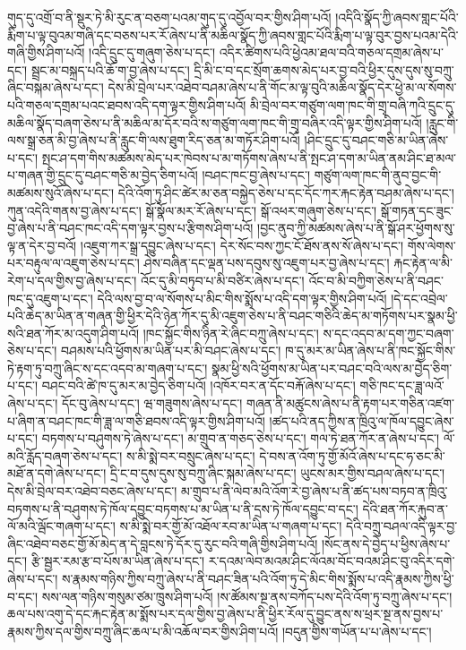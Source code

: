 གུད་དུ་འགྲོ་བ་ནི་སྡུར་ཏེ་མི་རུང་ན་བཅག་པའམ་གུད་དུ་འབྱོལ་བར་གྱིས་ཤིག་པའོ། །འདིའི་སྣོད་ཀྱི་ཞབས་གླང་པོའི་རྨིག་པ་ལྟ་བུའམ་གཞི་དང་བཅས་པར་རོ་ཞེས་པ་ནི་མཆིལ་སྣོད་ཀྱི་ཞབས་གླང་པོའི་རྨིག་པ་ལྟ་བུར་བྱས་པའམ་དེའི་གཞི་གྱིས་ཤིག་པའོ། །འདི་དྲུང་དུ་གཞུག་ཅེས་པ་དང་། འདིར་ཚིགས་པའི་ཕྱེའམ་ཐལ་བའི་གཅལ་དགྲམ་ཞེས་པ་དང་། སྦྲང་མ་བསྐྲད་པའི་ཆོ་ག་བྱ་ཞེས་པ་དང་། དྲི་མི་ང་བ་དང་སྲོག་ཆགས་མེད་པར་བྱ་བའི་ཕྱིར་དུས་དུས་སུ་བཀྲུ་ཞིང་བསྐམ་ཞེས་པ་དང་། དེས་མི་བྲེལ་པར་འཐེབ་བཤམ་ཞེས་པ་ནི་གོང་མ་ལྟ་བུའི་མཆིལ་སྣོད་དེར་ཕྱེ་མ་ལ་སོགས་པའི་གཅལ་དགྲམ་པའང་ཐབས་འདི་དག་ལྟར་གྱིས་ཤིག་པའོ། མི་བྲེལ་བར་གཙུག་ལག་ཁང་གི་གྲྭ་བཞི་ཀའི་དྲུང་དུ་མཆིལ་སྣོད་བཞག་ཅེས་པ་ནི་མཆིལ་མ་དོར་བའི་ས་གཙུག་ལག་ཁང་གི་གྲྭ་བཞིར་འདི་ལྟར་གྱིས་ཤིག་པའོ། །རླུང་གི་ལས་སྒྲ་ཅན་མི་བྱ་ཞེས་པ་ནི་རླུང་གི་ལས་ཐུག་རིད་ཅན་མ་གཏོར་ཤིག་པའོ། །ཤིང་དྲུང་དུ་བཤང་གཅི་མ་ཡིན་ཞེས་པ་དང་། སྤང་ཤ་དག་གིས་མཚམས་མེད་པར་ཁེབས་པ་མ་གཏོགས་ཞེས་པ་ནི་སྤང་ཤ་དག་མ་ཡིན་ནམ་ཤིང་ཐ་མལ་པ་གཞན་གྱི་དྲུང་དུ་བཤང་གཅི་མ་བྱེད་ཅིག་པའོ། །བཤང་ཁང་བྱ་ཞེས་པ་དང་། གཙུག་ལག་ཁང་གི་ནུབ་བྱང་གི་མཚམས་སུའོ་ཞེས་པ་དང་། དེའི་འོག་ཏུ་ཤིང་ཚེར་མ་ཅན་བསྐྱེད་ཅེས་པ་དང་དོང་ཀར་རྐང་རྟེན་བཤམ་ཞེས་པ་དང་། ཀུན་འདེའི་གནས་བྱ་ཞེས་པ་དང་། སྒོ་སྣོལ་མར་རོ་ཞེས་པ་དང་། སྒོ་འཕར་གཞུག་ཅེས་པ་དང་། སྒོ་གཏན་དང་ཟུང་བྱ་ཞེས་པ་ནི་བཤང་ཁང་འདི་དག་ལྟར་བྱས་པ་རྩིགས་ཤིག་པའོ། །བྱང་ནུབ་ཀྱི་མཚམས་ཞེས་པ་ནི་སྒོ་ཤར་ཕྱོགས་སུ་ལྟ་ན་དེར་བྱ་བའོ། །འཇུག་ཀར་སྒྲ་དབྱུང་ཞེས་པ་དང་། དེར་སོང་བས་ཀྱང་ངོ་ཐོས་ནས་སོ་ཞེས་པ་དང་། གོས་ལེགས་པར་བརྟུལ་ལ་འཇུག་ཅེས་པ་དང་། ཤེས་བཞིན་དང་ལྡན་པས་དབུས་སུ་འཇུག་པར་བྱ་ཞེས་པ་དང་། རྐང་རྟེན་ལ་མི་རེག་པ་དལ་གྱིས་བྱ་ཞེས་པ་དང་། འོང་དུ་མི་བཏུབ་པ་མི་བཙིར་ཞེས་པ་དང་། འོང་བ་མི་བཀྱིག་ཅེས་པ་ནི་བཤང་ཁང་དུ་འཇུག་པ་དང་། དེའི་ལས་བྱ་བ་ལ་སོགས་པ་མིང་གིས་སྨོས་པ་འདི་དག་ལྟར་གྱིས་ཤིག་པའོ། །དེ་དང་འབྲེལ་པའི་ཆེད་མ་ཡིན་ན་གཞན་གྱི་ཕྱིར་དེའི་ཉེན་ཀོར་དུ་མི་འཇུག་ཅེས་པ་ནི་བཤང་གཅིའི་ཆེད་མ་གཏོགས་པར་སྣམ་ཕྱི་སའི་ཐན་ཀོར་མ་འདུག་ཤིག་པའོ། །ཁང་སྐྱོང་གིས་ཉིན་རེ་ཞིང་བཀྲུ་ཞེས་པ་དང་། ས་དང་འདབ་མ་དག་ཀྱང་བཞག་ཅེས་པ་དང་། བཤམས་པའི་ཕྱོགས་མ་ཡིན་པར་མི་བཤང་ཞེས་པ་དང་། ཁ་དུ་མར་མ་ཡིན་ཞེས་པ་ནི་ཁང་སྐྱོང་གིས་ཏེ་རྟག་ཏུ་བཀྲུ་ཞིང་ས་དང་འདབ་མ་གཞག་པ་དང་། སྣམ་ཕྱི་སའི་ཕྱོགས་མ་ཡིན་པར་བཤང་བའི་ལས་མ་བྱེད་ཅིག་པ་དང་། བཤང་བའི་ཚེ་ཁ་དུ་མར་མ་བྱེད་ཅིག་པའོ། །འཁོར་བར་ན་དོང་བརྐོ་ཞེས་པ་དང་། གཅི་ཁང་དང་ཟླ་ལའོ་ཞེས་པ་དང་། དོང་བུ་ཞེས་པ་དང་། ཝ་གཟུགས་ཞེས་པ་དང་། གཞན་ནི་མཚུངས་ཞེས་པ་ནི་རྟག་པར་གཅིན་འཛག་པ་ཞིག་ན་བཤང་ཁང་གི་ཟླ་ལ་གཅི་ཐབས་འདི་ལྟར་གྱིས་ཤིག་པའོ། །ཚད་པའི་ནད་ཀྱིས་ན་ཁྲིའུ་ལ་ཁོལ་དབྱུང་ཞེས་པ་དང་། བཏགས་པ་བཤུགས་ཏེ་ཞེས་པ་དང་། མ་གྲུབ་ན་གཅད་ཅེས་པ་དང་། གལ་ཏེ་ཐན་ཀོར་ན་ཞེས་པ་དང་། ལོ་མའི་རློད་བཞག་ཅེས་པ་དང་། ས་མི་སྨེ་བར་བསྲུང་ཞེས་པ་དང་། དེ་བས་ན་འོག་ཏུ་གྱོ་མོའོ་ཞེས་པ་དང་ཧ་ཅང་མི་མཐོ་ན་དགེ་ཞེས་པ་དང་། དྲི་ང་བ་དུས་དུས་སུ་བཀྲུ་ཞིང་སྐམ་ཞེས་པ་དང་། ཡུངས་མར་གྱིས་བཤལ་ཞེས་པ་དང་། དེས་མི་བྲེལ་བར་འཐེབ་བཅང་ཞེས་པ་དང་། མ་གྲུབ་པ་ནི་ལེབ་མའི་འོག་རེ་བྱ་ཞེས་པ་ནི་ཚད་པས་བཏབ་ན་ཁྲིའུ་བཏགས་པ་ནི་བཤུགས་ཏེ་ཁོལ་དབྱུང་བཏགས་པ་མ་ཡིན་པ་ནི་དྲས་ཏེ་ཁོལ་དབྱུང་བ་དང་། དེའི་ཐན་ཀོར་རྐུབ་ན་ལོ་མའི་ལྦོང་གཞག་པ་དང་། ས་མི་སྨེ་བར་གྱོ་མོ་འཐོལ་རབ་མ་ཡིན་པ་གཞག་པ་དང་། དེའི་བཀྲུ་བཤལ་འདི་ལྟར་བྱ་ཞིང་འཐེབ་བཅང་གྱོ་མོ་མེད་ན་དེ་བླངས་ཏེ་དོར་དུ་རུང་བའི་གཞི་གྱིས་ཤིག་པའོ། །སོང་ནས་དེ་བྱེད་པ་ཕྱིས་ཞེས་པ་དང་། རྩི་སྦྱར་རམ་རྩ་བ་པོས་མ་ཡིན་ཞེས་པ་དང་། ར་དའམ་ལེབ་མའམ་ཤིང་ལོའམ་བོང་བའམ་ཤིང་བུ་འདིར་དགེ་ཞེས་པ་དང་། ས་རྣམས་གཉིས་ཀྱིས་བཀྲུ་ཞེས་པ་ནི་བཤང་ཟིན་པའི་འོག་ཏུ་དེ་མིང་གིས་སྨོས་པ་འདི་རྣམས་ཀྱིས་ཕྱི་བ་དང་། སས་ལན་གཉིས་གསུམ་ཙམ་ཁྲུས་ཤིག་པའོ། །ས་ཚོམས་སྔ་ནས་བཀོད་པས་དེའི་འོག་ཏུ་བཀྲུ་ཞེས་པ་དང་། ཆལ་པས་འགུ་དེ་དང་རྐང་རྟེན་མ་སྨོས་པར་དལ་གྱིས་བྱ་ཞེས་པ་ནི་ཕྱིར་རོལ་དུ་བྱུང་ནས་ས་ཕྲར་སྔ་ནས་བྱས་པ་རྣམས་ཀྱིས་དལ་གྱིས་བཀྲུ་ཞིང་ཆལ་པ་མི་འཆོལ་བར་གྱིས་ཤིག་པའོ། །བདུན་གྱིས་གཡོན་པ་པ་ཞེས་པ་དང་། 
